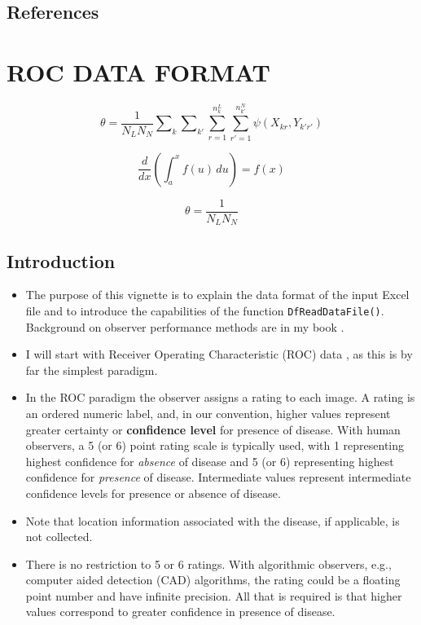\documentclass[
]{book}
\providecommand{\tightlist}{%
  \setlength{\itemsep}{0pt}\setlength{\parskip}{0pt}}
\begin{document}
\hypertarget{references}{%
\section{References}\label{references}}

\hypertarget{rocdataformat}{%
\chapter{ROC DATA FORMAT}\label{rocdataformat}}

\begin{equation*} 
\theta =\frac{1}{N_LN_N}\sum\nolimits_k{\sum\nolimits_{k'}{\sum\limits_{r=1}^{n_{k}^{L}}{\sum\limits_{r'=1}^{n_{k'}^{N}}{\psi (X_{kr},{Y_{k'r'}})}}}}
\end{equation*}

\begin{equation*} 
\frac{d}{dx}\left( \int_{a}^{x} f(u)\,du\right)=f(x)
\end{equation*}

\begin{equation*} 
\theta =\frac{1}{N_L N_N}
\end{equation*}

\hypertarget{introduction}{%
\section{Introduction}\label{introduction}}

\begin{itemize}
\tightlist
\item
  The purpose of this vignette is to explain the data format of the input Excel file and to introduce the capabilities of the function \texttt{DfReadDataFile()}. Background on observer performance methods are in my book \citep{RN2680}.
\item
  I will start with Receiver Operating Characteristic (ROC) data \citep{RN1766}, as this is by far the simplest paradigm.
\item
  In the ROC paradigm the observer assigns a rating to each image. A rating is an ordered numeric label, and, in our convention, higher values represent greater certainty or \textbf{confidence level} for presence of disease. With human observers, a 5 (or 6) point rating scale is typically used, with 1 representing highest confidence for \emph{absence} of disease and 5 (or 6) representing highest confidence for \emph{presence} of disease. Intermediate values represent intermediate confidence levels for presence or absence of disease.
\item
  Note that location information associated with the disease, if applicable, is not collected.
\item
  There is no restriction to 5 or 6 ratings. With algorithmic observers, e.g., computer aided detection (CAD) algorithms, the rating could be a floating point number and have infinite precision. All that is required is that higher values correspond to greater confidence in presence of disease.
\end{itemize}
\end{document}
